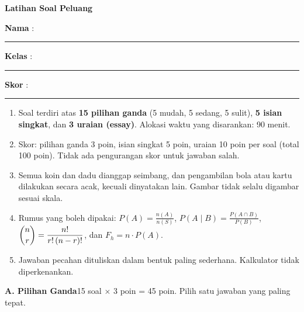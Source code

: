 \documentclass[a4paper,11pt]{article}
\newcommand{\dis}{\displaystyle}
\newcounter{no}
\newcommand{\bagian}[2]{\par\Needspace{12\baselineskip}\vspace{1.0em}\noindent
  \begin{tcolorbox}[colback=navy,colframe=navy,coltext=white,boxrule=0pt,arc=2pt,left=6pt,right=6pt,top=3pt,bottom=3pt]
  \textbf{#1}\hfill{\small #2}\end{tcolorbox}\setcounter{no}{0}\par\vspace{-0.3em}}
\begin{document}
\thispagestyle{fancy}

\begin{center}
  {\color{navy}\fontsize{22}{26}\selectfont\bfseries Latihan Soal Peluang\par}
\end{center}
\vspace{2pt}
\begin{tcolorbox}[colback=softbg,colframe=navy!40,boxrule=0.6pt,arc=3pt,left=8pt,right=8pt,top=5pt,bottom=5pt]
\noindent\textbf{Nama} : \rule{4.6cm}{0.4pt}\hfill\textbf{Kelas} : \rule{2.2cm}{0.4pt}\hfill\textbf{Skor} : \rule{2.2cm}{0.4pt}
\end{tcolorbox}
\vspace{2pt}
\begin{tcolorbox}[colback=white,colframe=teal,boxrule=0.8pt,arc=3pt,left=8pt,right=8pt,top=4pt,bottom=4pt,title={\bfseries Petunjuk Pengerjaan},coltitle=white,fonttitle=\small]
\small
\begin{enumerate}[leftmargin=1.4em,itemsep=1pt,topsep=1pt]
\item Soal terdiri atas \textbf{15 pilihan ganda} (5 mudah, 5 sedang, 5 sulit), \textbf{5 isian singkat}, dan \textbf{3 uraian (essay)}. Alokasi waktu yang disarankan: 90 menit.
\item Skor: pilihan ganda 3 poin, isian singkat 5 poin, uraian 10 poin per soal (total 100 poin). Tidak ada pengurangan skor untuk jawaban salah.
\item Semua koin dan dadu dianggap seimbang, dan pengambilan bola atau kartu dilakukan secara acak, kecuali dinyatakan lain. Gambar tidak selalu digambar sesuai skala.
\item Rumus yang boleh dipakai: $P(A)=\dis\frac{n(A)}{n(S)}$, $P(A\mid B)=\dis\frac{P(A\cap B)}{P(B)}$, $\dbinom nr=\dis\frac{n!}{r!\,(n-r)!}$, dan $F_h=n\cdot P(A)$.
\item Jawaban pecahan dituliskan dalam bentuk paling sederhana. Kalkulator tidak diperkenankan.
\end{enumerate}
\end{tcolorbox}

\bagian{A. Pilihan Ganda}{15 soal $\times$ 3 poin = 45 poin. Pilih satu jawaban yang paling tepat.}
\end{document}
